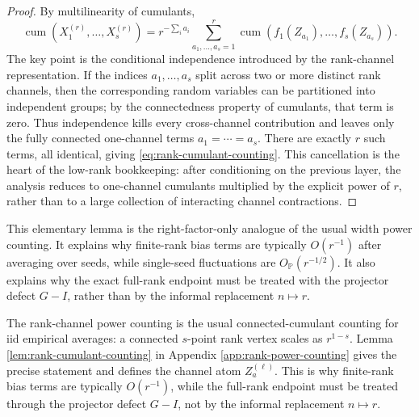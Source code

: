 \documentclass{article}
\newcommand{\Pp}{\mathbb P}
\newcommand{\cumul}{\operatorname{cum}}
\begin{document}
\begin{proof}
By multilinearity of cumulants,
\[
\cumul(X_1^{(r)},\ldots,X_s^{(r)})
=r^{-\sum_i a_i}
\sum_{a_1,\ldots,a_s=1}^{r}
\cumul(f_1(Z_{a_1}),\ldots,f_s(Z_{a_s})).
\]
The key point is the conditional independence introduced by the rank-channel representation. If the indices \(a_1,\ldots,a_s\) split across two or more distinct rank channels, then the corresponding random variables can be partitioned into independent groups; by the connectedness property of cumulants, that term is zero. Thus independence kills every cross-channel contribution and leaves only the fully connected one-channel terms \(a_1=\cdots=a_s\). There are exactly \(r\) such terms, all identical, giving \eqref{eq:rank-cumulant-counting}. This cancellation is the heart of the low-rank bookkeeping: after conditioning on the previous layer, the analysis reduces to one-channel cumulants multiplied by the explicit power of \(r\), rather than to a large collection of interacting channel contractions.
\end{proof}

This elementary lemma is the right-factor-only analogue of the usual width power counting. It explains why finite-rank bias terms are typically \(O(r^{-1})\) after averaging over seeds, while single-seed fluctuations are \(O_{\Pp}(r^{-1/2})\). It also explains why the exact full-rank endpoint must be treated with the projector defect \(G-I\), rather than by the informal replacement \(n\mapsto r\).
\fi

The rank-channel power counting is the usual connected-cumulant counting for iid empirical averages: a connected \(s\)-point rank vertex scales as \(r^{1-s}\). Lemma \ref{lem:rank-cumulant-counting} in Appendix \ref{app:rank-power-counting} gives the precise statement and defines the channel atom \(Z_a^{(\ell)}\). This is why finite-rank bias terms are typically \(O(r^{-1})\), while the full-rank endpoint must be treated through the projector defect \(G-I\), not by the informal replacement \(n\mapsto r\).
\end{document}
